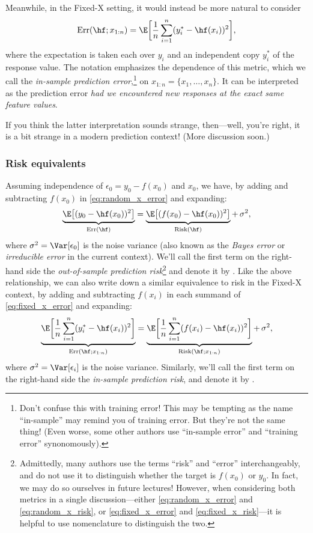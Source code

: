 \documentclass{article}
\begin{document}
Meanwhile, in the Fixed-X setting, it would instead be more natural to consider       
\begin{equation}
\label{eq:fixed_x_error}
\Err(\hf; x_{1:n}) = \E\bigg[ \frac{1}{n}\sum_{i=1}^n (y_i^* - \hf(x_i))^2
\bigg], 
\end{equation}
where the expectation is taken each over $y_i$ and an independent copy $y_i^*$
of the response value. The notation  emphasizes the 
dependence of this metric, which we call the \emph{in-sample prediction
  error},\footnote{Don't confuse this with training error! This may be tempting
  as the name ``in-sample'' may remind you of training error. But they're not
  the same thing! (Even worse, some other authors use ``in-sample error'' and
  ``training error'' synonomously).}     
on $x_{1:n} = \{x_1,\dots,x_n\}$. It can be interpreted as the prediction error
\emph{had we encountered new responses at the exact same feature values}.

If you think the latter interpretation sounds strange, then---well, you're
right, it is a bit strange in a modern prediction context! (More discussion
soon.)    

\subsubsection{Risk equivalents} 

Assuming independence of $\epsilon_0 = y_0 - f(x_0)$ and $x_0$, we have, by
adding and subtracting $f(x_0)$ in \eqref{eq:random_x_error} and expanding:  
\[
\underbrace{\E\big[ (y_0 - \hf(x_0))^2 \big]}_{\Err(\hf)} =
\underbrace{\E\big[ (f(x_0) - \hf(x_0))^2 \big]}_{\Risk(\hf)} +\, \sigma^2,
\]
where $\sigma^2 = \Var[\epsilon_0]$ is the noise variance (also known as the 
\emph{Bayes error} or \emph{irreducible error} in the current context). We'll
call the first term on the right-hand side the \emph{out-of-sample prediction
  risk}\footnote{Admittedly, many authors use the terms ``risk'' and ``error'' 
  interchangeably, and do not use it to distinguish whether the target is
  $f(x_0)$ or $y_0$. In fact, we may do so ourselves in future lectures!
  However, when considering both metrics in a single discussion---either 
  \eqref{eq:random_x_error} and \eqref{eq:random_x_risk}, or 
  \eqref{eq:fixed_x_error} and \eqref{eq:fixed_x_risk}---it is helpful to use  
  nomenclature to distinguish the two.} 
and denote it by \smash{$\Risk(\hf)$}. Like the above relationship, we can also
write down a similar equivalence to risk in the Fixed-X context, by adding and
subtracting $f(x_i)$ in each summand of \eqref{eq:fixed_x_error} and expanding:  
\[
\underbrace{\E\bigg[ \frac{1}{n}\sum_{i=1}^n (y_i^* - \hf(x_i))^2 
  \bigg]}_{\Err(\hf; x_{1:n})} =   
\underbrace{\E\bigg[ \frac{1}{n}\sum_{i=1}^n (f(x_i) - \hf(x_i))^2
  \bigg]}_{\Risk(\hf;  x_{1:n})} +\, \sigma^2, 
\]
where $\sigma^2 = \Var[\epsilon_i]$ is the noise variance. Similarly, we'll call
the first term on the right-hand side the \emph{in-sample prediction risk}, and
denote it by . 
\end{document}

